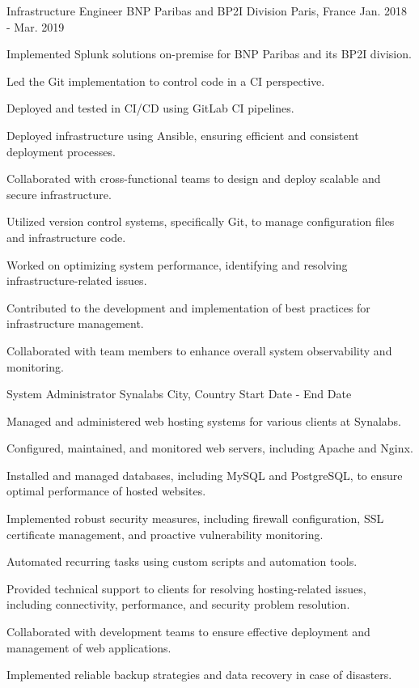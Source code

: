 \begin{cventries}
\cventry
{Infrastructure Engineer} %
{BNP Paribas and BP2I Division} %
{Paris, France} %
{Jan. 2018 - Mar. 2019} %
{
  \begin{cvitems} %
    \item {Implemented Splunk solutions on-premise for BNP Paribas and its BP2I division.}
    \item {Led the Git implementation to control code in a CI perspective.}
    \item {Deployed and tested in CI/CD using GitLab CI pipelines.}
    \item {Deployed infrastructure using Ansible, ensuring efficient and consistent deployment processes.}
    \item {Collaborated with cross-functional teams to design and deploy scalable and secure infrastructure.}
    \item {Utilized version control systems, specifically Git, to manage configuration files and infrastructure code.}
    \item {Worked on optimizing system performance, identifying and resolving infrastructure-related issues.}
    \item {Contributed to the development and implementation of best practices for infrastructure management.}
    \item {Collaborated with team members to enhance overall system observability and monitoring.}
  \end{cvitems}
}

\cventry
{System Administrator} %
{Synalabs} %
{City, Country} %
{Start Date - End Date} %
{
  \begin{cvitems} %
    \item {Managed and administered web hosting systems for various clients at Synalabs.}
    \item {Configured, maintained, and monitored web servers, including Apache and Nginx.}
    \item {Installed and managed databases, including MySQL and PostgreSQL, to ensure optimal performance of hosted websites.}
    \item {Implemented robust security measures, including firewall configuration, SSL certificate management, and proactive vulnerability monitoring.}
    \item {Automated recurring tasks using custom scripts and automation tools.}
    \item {Provided technical support to clients for resolving hosting-related issues, including connectivity, performance, and security problem resolution.}
    \item {Collaborated with development teams to ensure effective deployment and management of web applications.}
    \item {Implemented reliable backup strategies and data recovery in case of disasters.}
  \end{cvitems}
}


\end{cventries}
